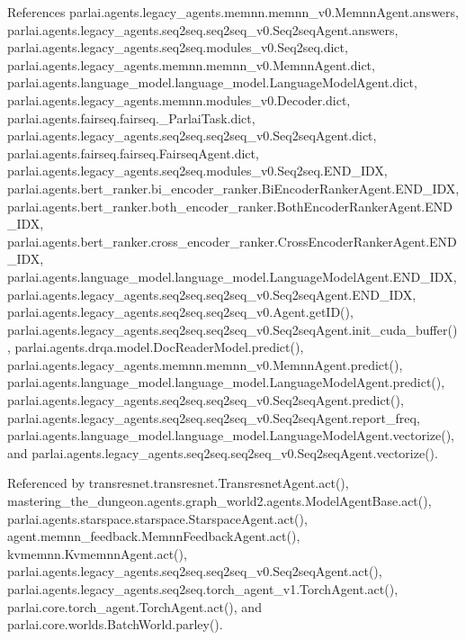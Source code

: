 References parlai.\+agents.\+legacy\+\_\+agents.\+memnn.\+memnn\+\_\+v0.\+Memnn\+Agent.\+answers, parlai.\+agents.\+legacy\+\_\+agents.\+seq2seq.\+seq2seq\+\_\+v0.\+Seq2seq\+Agent.\+answers, parlai.\+agents.\+legacy\+\_\+agents.\+seq2seq.\+modules\+\_\+v0.\+Seq2seq.\+dict, parlai.\+agents.\+legacy\+\_\+agents.\+memnn.\+memnn\+\_\+v0.\+Memnn\+Agent.\+dict, parlai.\+agents.\+language\+\_\+model.\+language\+\_\+model.\+Language\+Model\+Agent.\+dict, parlai.\+agents.\+legacy\+\_\+agents.\+memnn.\+modules\+\_\+v0.\+Decoder.\+dict, parlai.\+agents.\+fairseq.\+fairseq.\+\_\+\+Parlai\+Task.\+dict, parlai.\+agents.\+legacy\+\_\+agents.\+seq2seq.\+seq2seq\+\_\+v0.\+Seq2seq\+Agent.\+dict, parlai.\+agents.\+fairseq.\+fairseq.\+Fairseq\+Agent.\+dict, parlai.\+agents.\+legacy\+\_\+agents.\+seq2seq.\+modules\+\_\+v0.\+Seq2seq.\+E\+N\+D\+\_\+\+I\+DX, parlai.\+agents.\+bert\+\_\+ranker.\+bi\+\_\+encoder\+\_\+ranker.\+Bi\+Encoder\+Ranker\+Agent.\+E\+N\+D\+\_\+\+I\+DX, parlai.\+agents.\+bert\+\_\+ranker.\+both\+\_\+encoder\+\_\+ranker.\+Both\+Encoder\+Ranker\+Agent.\+E\+N\+D\+\_\+\+I\+DX, parlai.\+agents.\+bert\+\_\+ranker.\+cross\+\_\+encoder\+\_\+ranker.\+Cross\+Encoder\+Ranker\+Agent.\+E\+N\+D\+\_\+\+I\+DX, parlai.\+agents.\+language\+\_\+model.\+language\+\_\+model.\+Language\+Model\+Agent.\+E\+N\+D\+\_\+\+I\+DX, parlai.\+agents.\+legacy\+\_\+agents.\+seq2seq.\+seq2seq\+\_\+v0.\+Seq2seq\+Agent.\+E\+N\+D\+\_\+\+I\+DX, parlai.\+agents.\+legacy\+\_\+agents.\+seq2seq.\+seq2seq\+\_\+v0.\+Agent.\+get\+I\+D(), parlai.\+agents.\+legacy\+\_\+agents.\+seq2seq.\+seq2seq\+\_\+v0.\+Seq2seq\+Agent.\+init\+\_\+cuda\+\_\+buffer(), parlai.\+agents.\+drqa.\+model.\+Doc\+Reader\+Model.\+predict(), parlai.\+agents.\+legacy\+\_\+agents.\+memnn.\+memnn\+\_\+v0.\+Memnn\+Agent.\+predict(), parlai.\+agents.\+language\+\_\+model.\+language\+\_\+model.\+Language\+Model\+Agent.\+predict(), parlai.\+agents.\+legacy\+\_\+agents.\+seq2seq.\+seq2seq\+\_\+v0.\+Seq2seq\+Agent.\+predict(), parlai.\+agents.\+legacy\+\_\+agents.\+seq2seq.\+seq2seq\+\_\+v0.\+Seq2seq\+Agent.\+report\+\_\+freq, parlai.\+agents.\+language\+\_\+model.\+language\+\_\+model.\+Language\+Model\+Agent.\+vectorize(), and parlai.\+agents.\+legacy\+\_\+agents.\+seq2seq.\+seq2seq\+\_\+v0.\+Seq2seq\+Agent.\+vectorize().



Referenced by transresnet.\+transresnet.\+Transresnet\+Agent.\+act(), mastering\+\_\+the\+\_\+dungeon.\+agents.\+graph\+\_\+world2.\+agents.\+Model\+Agent\+Base.\+act(), parlai.\+agents.\+starspace.\+starspace.\+Starspace\+Agent.\+act(), agent.\+memnn\+\_\+feedback.\+Memnn\+Feedback\+Agent.\+act(), kvmemnn.\+Kvmemnn\+Agent.\+act(), parlai.\+agents.\+legacy\+\_\+agents.\+seq2seq.\+seq2seq\+\_\+v0.\+Seq2seq\+Agent.\+act(), parlai.\+agents.\+legacy\+\_\+agents.\+seq2seq.\+torch\+\_\+agent\+\_\+v1.\+Torch\+Agent.\+act(), parlai.\+core.\+torch\+\_\+agent.\+Torch\+Agent.\+act(), and parlai.\+core.\+worlds.\+Batch\+World.\+parley().

